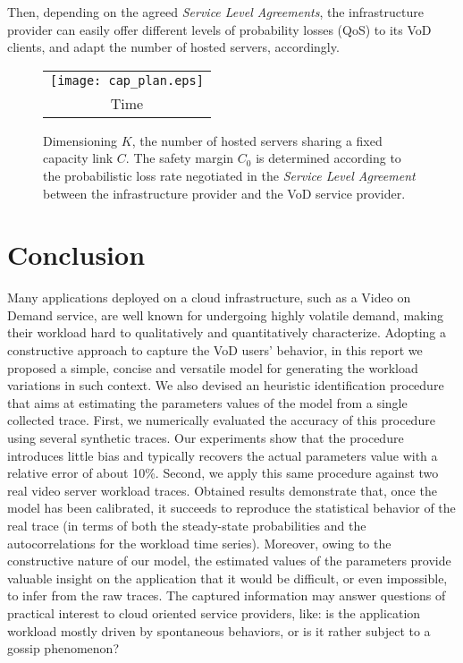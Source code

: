 \documentclass[twoside]{article}
\begin{document}
Then, depending on the agreed {\it Service Level Agreements}, the infrastructure provider can easily offer different levels of probability losses (QoS) to its VoD clients, and adapt  the number of hosted servers, accordingly.
\begin{figure} [h]
\centering
\begin{tabular}{c}
\texttt{[image: cap\_plan.eps]}\\
{\normalsize Time}
\end{tabular}
\caption{\small Dimensioning $K$, the number of hosted servers sharing a fixed capacity link $C$. The safety margin $C_0$ is determined according to the probabilistic loss rate negotiated in the {\it Service Level Agreement} between the infrastructure provider and the VoD service provider.}
\label{fig:caplan}
\end{figure}
\newpage

\section{Conclusion}
\label{sec:conclusion}
Many applications deployed on a cloud infrastructure, such as a Video on Demand service, are well known for undergoing highly volatile demand, making their workload hard to qualitatively and quantitatively characterize.
Adopting a constructive approach to capture the VoD users' behavior, in this report we  proposed a simple, concise and versatile model for generating the workload variations in such context.
We also devised an heuristic identification procedure that aims at estimating the parameters values of the model from a single collected trace. 
First, we numerically evaluated the accuracy of this procedure using several synthetic traces. 
Our experiments show that the procedure introduces little bias and typically recovers the actual parameters value with a relative error of about 10\%. 
Second, we apply this same procedure against two real video server workload traces. 
Obtained results demonstrate that, once the model has been calibrated, it succeeds to reproduce the statistical behavior of the real trace (in terms of both the steady-state probabilities and the autocorrelations for the workload time series).
Moreover, owing to the constructive nature of our model, the estimated values of the parameters provide valuable insight on the application that it would be difficult, or even impossible, to infer  from the raw traces. The captured information may answer questions of practical interest to cloud oriented service providers, like: is the application workload mostly driven by spontaneous behaviors, or is it rather subject to a  gossip phenomenon?
\end{document}

